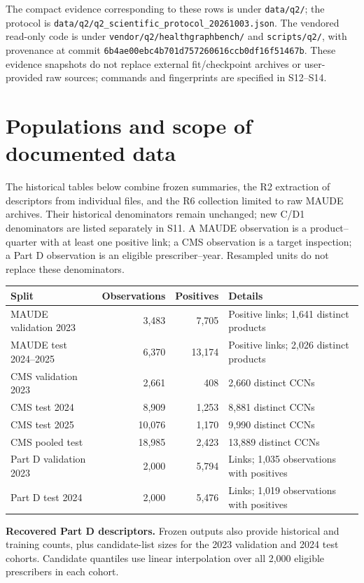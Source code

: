 \documentclass[10pt,a4paper]{article}
\newcommand{\src}[1]{{\small\nolinkurl{#1}}}
\begin{document}
The compact evidence corresponding to these rows is under \src{data/q2/}; the protocol is \src{data/q2/q2_scientific_protocol_20261003.json}. The vendored read-only code is under \src{vendor/q2/healthgraphbench/} and \src{scripts/q2/}, with provenance at commit \src{6b4ae00ebc4b701d757260616ccb0df16f51467b}. These evidence snapshots do not replace external fit/checkpoint archives or user-provided raw sources; commands and fingerprints are specified in S12--S14.



\section{Populations and scope of documented data}
\label{supp:population}
The historical tables below combine frozen summaries, the R2 extraction of descriptors from individual files, and the R6 collection limited to raw MAUDE archives. Their historical denominators remain unchanged; new C/D1 denominators are listed separately in S11. A MAUDE observation is a product--quarter with at least one positive link; a CMS observation is a target inspection; a Part D observation is an eligible prescriber--year. Resampled units do not replace these denominators.

\begin{tabularx}{\linewidth}{@{}p{35mm}rrX@{}}
\toprule
Split & Observations & Positives & Details\\
\midrule
MAUDE validation 2023 & 3,483 & 7,705 & Positive links; 1,641 distinct products\\
MAUDE test 2024--2025 & 6,370 & 13,174 & Positive links; 2,026 distinct products\\
CMS validation 2023 & 2,661 & 408 & 2,660 distinct CCNs\\
CMS test 2024 & 8,909 & 1,253 & 8,881 distinct CCNs\\
CMS test 2025 & 10,076 & 1,170 & 9,990 distinct CCNs\\
CMS pooled test & 18,985 & 2,423 & 13,889 distinct CCNs\\
Part D validation 2023 & 2,000 & 5,794 & Links; 1,035 observations with positives\\
Part D test 2024 & 2,000 & 5,476 & Links; 1,019 observations with positives\\
\bottomrule
\end{tabularx}

\textbf{Recovered Part D descriptors.} Frozen outputs also provide historical and training counts, plus candidate-list sizes for the 2023 validation and 2024 test cohorts. Candidate quantiles use linear interpolation over all 2,000 eligible prescribers in each cohort.
\end{document}
